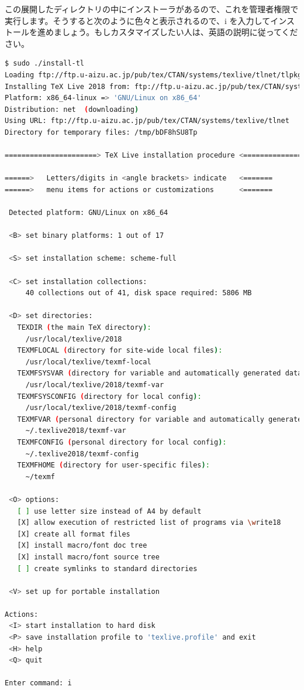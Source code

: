 この展開したディレクトリの中にインストーラがあるので、これを管理者権限で実行します。そうすると次のように色々と表示されるので、i を入力してインストールを進めましょう。もしカスタマイズしたい人は、英語の説明に従ってください。

\begin{lstlisting}[language=bash]
$ sudo ./install-tl
Loading ftp://ftp.u-aizu.ac.jp/pub/tex/CTAN/systems/texlive/tlnet/tlpkg/texlive.tlpdb
Installing TeX Live 2018 from: ftp://ftp.u-aizu.ac.jp/pub/tex/CTAN/systems/texlive/tlnet (verified)
Platform: x86_64-linux => 'GNU/Linux on x86_64'
Distribution: net  (downloading)
Using URL: ftp://ftp.u-aizu.ac.jp/pub/tex/CTAN/systems/texlive/tlnet
Directory for temporary files: /tmp/bDF8hSU8Tp

======================> TeX Live installation procedure <=====================

======>   Letters/digits in <angle brackets> indicate   <=======
======>   menu items for actions or customizations      <=======

 Detected platform: GNU/Linux on x86_64
 
 <B> set binary platforms: 1 out of 17

 <S> set installation scheme: scheme-full

 <C> set installation collections:
     40 collections out of 41, disk space required: 5806 MB

 <D> set directories:
   TEXDIR (the main TeX directory):
     /usr/local/texlive/2018
   TEXMFLOCAL (directory for site-wide local files):
     /usr/local/texlive/texmf-local
   TEXMFSYSVAR (directory for variable and automatically generated data):
     /usr/local/texlive/2018/texmf-var
   TEXMFSYSCONFIG (directory for local config):
     /usr/local/texlive/2018/texmf-config
   TEXMFVAR (personal directory for variable and automatically generated data):
     ~/.texlive2018/texmf-var
   TEXMFCONFIG (personal directory for local config):
     ~/.texlive2018/texmf-config
   TEXMFHOME (directory for user-specific files):
     ~/texmf

 <O> options:
   [ ] use letter size instead of A4 by default
   [X] allow execution of restricted list of programs via \write18
   [X] create all format files
   [X] install macro/font doc tree
   [X] install macro/font source tree
   [ ] create symlinks to standard directories

 <V> set up for portable installation

Actions:
 <I> start installation to hard disk
 <P> save installation profile to 'texlive.profile' and exit
 <H> help
 <Q> quit

Enter command: i
\end{lstlisting}

